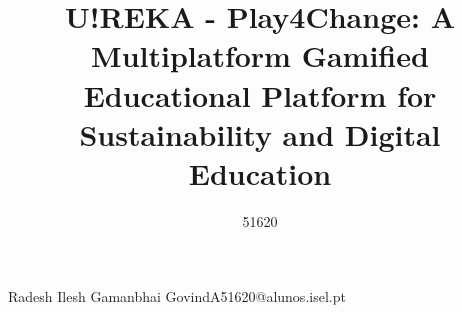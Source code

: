 \def\thetitle{%
 U!REKA - Play4Change: A Multiplatform Gamified Educational Platform for Sustainability and Digital Education
}
\def\theauthor{%
 A51620
}

\title{ \thetitle }

\author{51620}{Radesh Ilesh Gamanbhai Govind}{A51620@alunos.isel.pt}



